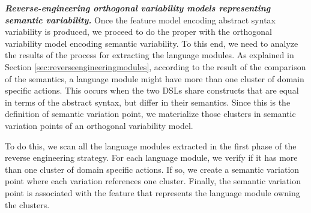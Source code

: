 
\vspace{2mm}
\textit{\textbf{Reverse-engineering orthogonal variability models representing semantic variability.}} Once the feature model encoding abstract syntax variability is produced, we proceed to do the proper with the orthogonal variability model encoding semantic variability. To this end, we need to analyze the results of the process for extracting the language modules. As explained in Section \ref{sec:reverseengineeringmodules}, according to the result of the comparison of the semantics, a language module might have more than one cluster of domain specific actions. This occurs when the two DSLs share constructs that are equal in terms of the abstract syntax, but differ in their semantics. Since this is the definition of semantic variation point, we materialize those clusters in semantic variation points of an orthogonal variability model.

To do this, we scan all the language modules extracted in the first phase of the reverse engineering strategy. For each language module, we verify if it has more than one cluster of domain specific actions. If so, we create a semantic variation point where each variation references one cluster. Finally, the semantic variation point is associated with the feature that represents the language module owning the clusters. 